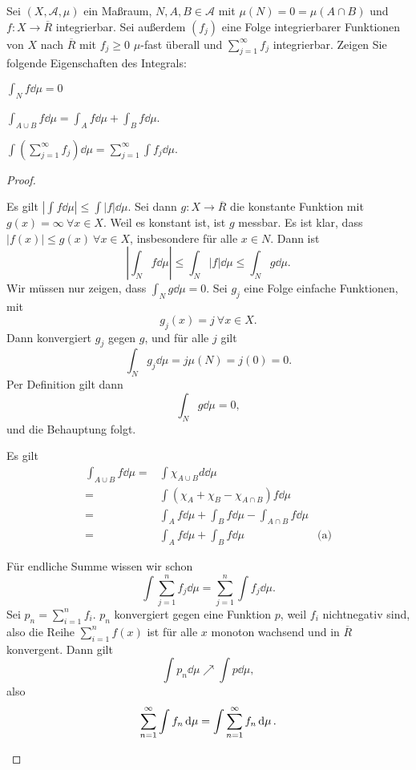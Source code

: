 \begin{Problem}\label{pr:advanalblatt6-2}
	Sei $(X,\mathcal{A},\mu)$ ein Maßraum, $N,A,B\in \mathcal{A}$ mit $\mu(N)=0=\mu(A\cap B)$ und $f:X\to \overline{R}$ integrierbar. Sei außerdem $(f_j)$ eine Folge integrierbarer Funktionen von $X$ nach $\overline{R}$ mit $f_j\ge 0$ $\mu$-fast überall und $\sum_{j=1}^{\infty} f_j$ integrierbar. Zeigen Sie folgende Eigenschaften des Integrals:
	\begin{parts}
	\item $\int_N f\dd{\mu}=0$
	\item $\int_{A\cup B}f\dd{\mu}=\int_A f\dd{\mu}+\int_B f\dd{\mu}$.
	\item $\int \left( \sum_{j=1}^{\infty} f_j \right) \dd{\mu}=\sum_{j=1}^{\infty} \int f_j\dd{\mu}$.
	\end{parts}
\end{Problem}
\begin{proof}
	\begin{parts}
	\item Es gilt $\left| \int f\dd{\mu} \right| \le \int |f|\dd{\mu}$. Sei dann $g:X\to \overline{R}$ die konstante Funktion mit $g(x)=\infty~\forall x\in X$. Weil es konstant ist, ist $g$ messbar. Es ist klar, dass $|f(x)|\le g(x)~\forall x\in X$, insbesondere für alle $x\in N$. Dann ist
		\[
			\left| \int_N f\dd{\mu} \right| \le \int_N |f|\dd{\mu}\le \int_N g\dd{\mu}
		.\] 
		Wir müssen nur zeigen, dass $\int_N g\dd{\mu}=0$. Sei $g_j$ eine Folge einfache Funktionen, mit
		\[
		g_j(x)=j~\forall x\in X
		.\] 
		Dann konvergiert $g_j$ gegen $g$, und f\"{u}r alle $j$ gilt
		\[
			\int_N g_j\dd{\mu}=j\mu(N)=j(0)=0
		.\] 
		Per Definition gilt dann
		\[
			\int_N g\dd{\mu}=0
		,\] 
		und die Behauptung folgt.
	\item Es gilt
		\begin{align*}
			\int_{A\cup B}f\dd{\mu}=& \int \chi_{A\cup B}d\dd{\mu}\\
			=& \int\left( \chi_A+\chi_B-\chi_{A\cap B} \right) f\dd{\mu}\\
			=& \int_A f\dd{\mu}+\int_B f\dd{\mu}-\int_{A\cap B}f\dd{\mu}\\
			=&\int_A f\dd{\mu}+\int_B f\dd{\mu} & \text{(a)}
		\end{align*}
	\item Für endliche Summe wissen wir schon
		\[
			\int \sum_{j=1}^{n} f_j\dd{\mu}=\sum_{j=1}^{n} \int f_j\dd{\mu} 
		.\] 
		Sei $p_n=\sum_{i=1}^n f_i$. $p_n$ konvergiert gegen eine Funktion $p$, weil $f_i$ nichtnegativ sind, also die Reihe $\sum_{i=1}^n f(x)$ ist für alle $x$ monoton wachsend und in $\overline{R}$ konvergent. Dann gilt
		\[
			\int p_n\dd{\mu}\nearrow \int p\dd{\mu}
		,\]
		also
		\[
			\sum_{n=1}^{\infty} \int f_n\dd{\mu}=\int \sum_{n=1}^{\infty} f_n\dd{\mu}
		.\qedhere\] 
	\end{parts}
\end{proof}

